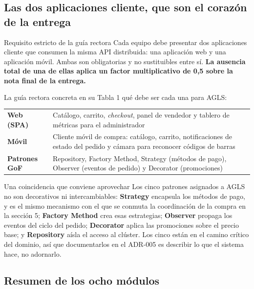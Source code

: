 \documentclass[11pt,a4paper]{article}
\begin{document}
\subsection{Las dos aplicaciones cliente, que son el corazón de la entrega}

\begin{pisoBox}{Requisito estricto de la guía rectora}
	Cada equipo debe presentar dos aplicaciones cliente que consumen la misma API distribuida: una aplicación web y una aplicación móvil. Ambas son obligatorias y no sustituibles entre sí. \textbf{La ausencia total de una de ellas aplica un factor multiplicativo de 0,5 sobre la nota final de la entrega.}
\end{pisoBox}

La guía rectora concreta en su Tabla 1 qué debe ser cada una para AGLS:

\begin{center}
	\small
	\begin{tabular}{@{}p{2.5cm}p{12.5cm}@{}}
		\toprule
		\textbf{Web (SPA)} & Catálogo, carrito, \emph{checkout}, panel de vendedor y tablero de métricas para el administrador \\
		\addlinespace
		\textbf{Móvil} & Cliente móvil de compra: catálogo, carrito, notificaciones de estado del pedido y cámara para reconocer códigos de barras \\
		\addlinespace
		\textbf{Patrones GoF} & Repository, Factory Method, Strategy (métodos de pago), Observer (eventos de pedido) y Decorator (promociones) \\
		\bottomrule
	\end{tabular}
\end{center}

\begin{defBox}{Una coincidencia que conviene aprovechar}
	Los cinco patrones asignados a AGLS no son decorativos ni intercambiables: \textbf{Strategy} encapsula los métodos de pago, y es el mismo mecanismo con el que se conmuta la coordinación de la compra en la sección 5; \textbf{Factory Method} crea esas estrategias; \textbf{Observer} propaga los eventos del ciclo del pedido; \textbf{Decorator} aplica las promociones sobre el precio base; y \textbf{Repository} aísla el acceso al clúster. Los cinco están en el camino crítico del dominio, así que documentarlos en el ADR-005 es describir lo que el sistema hace, no adornarlo.
\end{defBox}

\subsection{Resumen de los ocho módulos}
\end{document}
